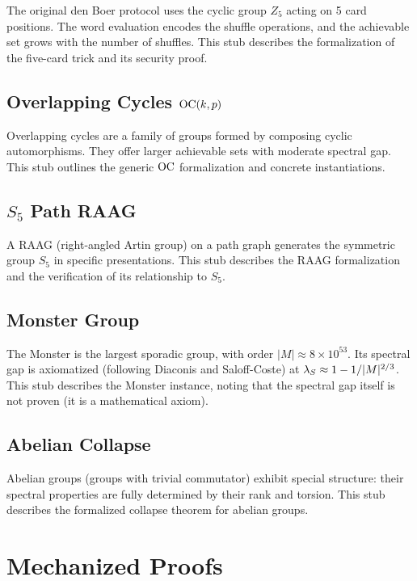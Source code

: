 \documentclass[11pt,a4paper]{article}
\begin{document}
The original den Boer protocol uses the cyclic group $Z_5$ acting on 5 card positions.
The word evaluation encodes the shuffle operations, and the achievable set grows with the number of shuffles.
This stub describes the \Rocq formalization of the five-card trick and its security proof.

\subsection{Overlapping Cycles $\mathrm{OC}(k,p)$}
\label{sec:inst-oc}

Overlapping cycles are a family of groups formed by composing cyclic automorphisms.
They offer larger achievable sets with moderate spectral gap.
This stub outlines the generic $\mathrm{OC}$ formalization and concrete instantiations.

\subsection{$S_5$ Path RAAG}
\label{sec:inst-s5}

A RAAG (right-angled Artin group) on a path graph generates the symmetric group $S_5$ in specific presentations.
This stub describes the RAAG formalization and the verification of its relationship to $S_5$.

\subsection{Monster Group}
\label{sec:inst-monster}

The Monster is the largest sporadic group, with order $|M| \approx 8 \times 10^{53}$.
Its spectral gap is axiomatized (following Diaconis and Saloff-Coste) at $\lambda_S \approx 1 - 1/|M|^{2/3}$.
This stub describes the Monster instance, noting that the spectral gap itself is not proven (it is a mathematical axiom).

\subsection{Abelian Collapse}
\label{sec:inst-abelian}

Abelian groups (groups with trivial commutator) exhibit special structure: their spectral properties are fully determined by their rank and torsion.
This stub describes the formalized collapse theorem for abelian groups.

\section{Mechanized Proofs}
\label{sec:methodology}
\end{document}
